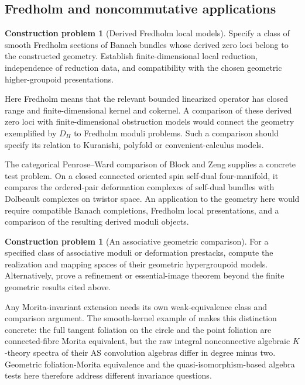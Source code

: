 \documentclass[12pt]{amsart}
\theoremstyle{definition}
\newtheorem{construction}[thm]{Construction problem}
\theoremstyle{remark}
\numberwithin{equation}{section}
\begin{document}
\subsection{Fredholm and noncommutative applications}

\begin{construction}[Derived Fredholm local models]
\label{problem:fredholm}
Specify a class of smooth Fredholm sections
of Banach bundles whose derived zero loci
belong to the constructed geometry.
Establish finite-dimensional local
reduction, independence of reduction data,
and compatibility with the chosen
geometric higher-groupoid presentations.
\end{construction}

Here Fredholm means that the relevant bounded
linearized operator has closed range and
finite-dimensional kernel and cokernel.
A comparison of these derived zero loci with
finite-dimensional obstruction models would connect
the geometry exemplified by $D_H$ to Fredholm
moduli problems. Such a comparison should specify
its relation to Kuranishi, polyfold or
convenient-calculus models.

The categorical Penrose--Ward comparison of Block and Zeng
\cite[Theorem~1.1]{BlockZengWard2026} supplies a concrete test problem.
On a closed connected oriented spin self-dual four-manifold,
it compares the ordered-pair deformation complexes of
self-dual bundles with Dolbeault complexes on twistor space.
An application to the geometry here would require compatible
Banach completions, Fredholm local presentations, and a
comparison of the resulting derived moduli objects.

\begin{construction}[An associative geometric comparison]
\label{problem:nc-comparison}
For a specified class of associative
moduli or deformation prestacks, compute
the realization and mapping spaces of
their geometric hypergroupoid models.
Alternatively, prove a refinement or
essential-image theorem beyond the
finite geometric results cited above.
\end{construction}

Any Morita-invariant extension needs its
own weak-equivalence class and comparison
argument. The smooth-kernel example of
\cite[Theorem~5.4]{SmoothKernelKTheory2026} makes this distinction
concrete: the full tangent foliation on the circle and
the point foliation are connected-fibre Morita equivalent,
but the raw integral nonconnective algebraic $K$-theory
spectra of their AS convolution algebras differ in
degree minus two. Geometric foliation-Morita equivalence
and the quasi-isomorphism-based algebra tests here
therefore address different invariance questions.
\end{document}
